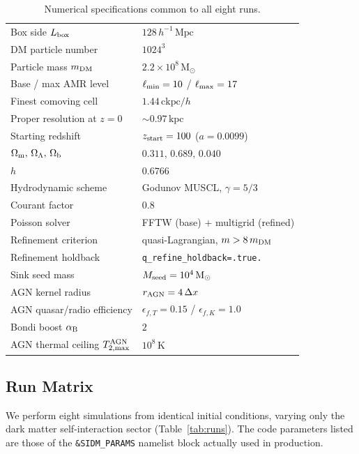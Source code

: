 \documentclass[fleqn,usenatbib]{mnras}
\newcommand{\code}[1]{\texttt{#1}}
\newcommand{\Msun}{\mathrm{M_\odot}}
\newcommand{\Mpc}{\,\mathrm{Mpc}}
\newcommand{\kpc}{\,\mathrm{kpc}}
\begin{document}
\begin{table}
\centering
\caption{Numerical specifications common to all eight runs.}
\label{tab:specs}
\begin{tabular}{ll}
\toprule
Box side $L_{\rm box}$ & $128\,h^{-1}\Mpc$ \\
DM particle number & $1024^{3}$ \\
Particle mass $m_{\rm DM}$ & $2.2\times 10^{8}\,\Msun$ \\
Base / max AMR level & $\ell_{\rm min}=10$ / $\ell_{\rm max}=17$ \\
Finest comoving cell & $1.44\,\mathrm{ckpc}/h$ \\
Proper resolution at $z=0$ & $\sim 0.97\kpc$ \\
Starting redshift & $z_{\rm start} = 100$ ($a = 0.0099$) \\
$\Omega_{\rm m},\,\Omega_\Lambda,\,\Omega_{\rm b}$
  & $0.311,\,0.689,\,0.040$ \\
$h$ & $0.6766$ \\
Hydrodynamic scheme & Godunov MUSCL, $\gamma=5/3$ \\
Courant factor & $0.8$ \\
Poisson solver & FFTW (base) $+$ multigrid (refined) \\
Refinement criterion & quasi-Lagrangian, $m>8\,m_{\rm DM}$ \\
Refinement holdback & \code{q\_refine\_holdback=.true.} \\
Sink seed mass & $M_{\rm seed}=10^{4}\,\Msun$ \\
AGN kernel radius & $r_{\rm AGN}=4\,\Delta x$ \\
AGN quasar/radio efficiency
  & $\epsilon_{f,T}=0.15$ / $\epsilon_{f,K}=1.0$ \\
Bondi boost $\alpha_{\rm B}$ & $2$ \\
AGN thermal ceiling $T^{\rm AGN}_{2,\max}$ & $10^{8}\,$K \\
\bottomrule
\end{tabular}
\end{table}

\subsection{Run Matrix}
\label{sec:runmatrix}

We perform eight simulations from identical initial conditions,
varying only the dark matter self-interaction sector
(Table~\ref{tab:runs}).  The code parameters listed are those of
the \code{\&SIDM\_PARAMS} namelist block actually used in
production.
\end{document}
